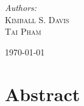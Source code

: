 \documentclass[11pt]{article}
\begin{document}
\begin{titlepage}
	{\Large\textit{Authors:}}\\
 	\Large\textsc{Kimball S. Davis}\\
	 \Large\textsc{Tai Pham} %
	
	
	\vfill\vfill\vfill %
	
	{\large\today} %
	
	
	 
	
	\vfill %
	
\end{titlepage}



\section*{Abstract}
\end{document}
